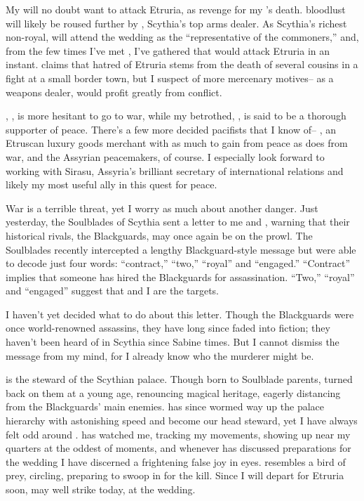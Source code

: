 \documentclass[char]{Kos}
\begin{document}
My \cScythiaQueen{\parent} will no doubt want to attack Etruria, as revenge for my \cFugitive{\sibling}'s death. \cScythiaQueen{\Their} bloodlust will likely be roused further by \cArmsDealer{}, Scythia's top arms dealer. As Scythia's richest non-royal, \cArmsDealer{} will attend the wedding as the ``representative of the commoners,'' and, from the few times I've met \cArmsDealer{\them}, I've gathered that \cArmsDealer{\they} would attack Etruria in an instant. \cArmsDealer{\They} claims that \cArmsDealer{\their} hatred of Etruria stems from the death of several cousins in a fight at a small border town, but I suspect \cArmsDealer{\them} of more mercenary motives-- as a weapons dealer, \cArmsDealer{} would profit greatly from conflict. 

\cScythiaKing{}, \cScythiaKing{\parent}, is more hesitant to go to war, while my betrothed, \cGroom{}, is said to be a thorough supporter of peace. There's a few more decided pacifists that I know of-- \cMerchant{}, an Etruscan luxury goods merchant with as much to gain from peace as \cArmsDealer{} does from war, and the Assyrian peacemakers, of course. I especially look forward to working with Sirasu, Assyria's brilliant secretary of international relations and likely my most useful ally in this quest for peace.

War is a terrible threat, yet I worry as much about another danger. Just yesterday, the Soulblades of Scythia sent a letter to me and \cGroom{}, warning that their historical rivals, the Blackguards, may once again be on the prowl. The Soulblades recently intercepted a lengthy Blackguard-style message but were able to decode just four words: ``contract,'' ``two,'' ``royal'' and ``engaged.'' ``Contract'' implies that someone has hired the Blackguards for assassination. ``Two,'' ``royal'' and ``engaged'' suggest that \cGroom{} and I are the targets.

I haven't yet decided what to do about this letter. Though the Blackguards were once world-renowned assassins, they have long since faded into fiction; they haven't been heard of in Scythia since Sabine times. But I cannot dismiss the message from my mind, for I already know who the murderer might be.

\cButler{} is the steward of the Scythian palace. Though born to Soulblade parents, \cButler{\they} turned \cButler{\their} back on them at a young age, renouncing \cButler{\their} magical heritage, eagerly distancing \cButler{\themself} from the Blackguards' main enemies. \cButler{\They} has since wormed \cButler{\their} way up the palace hierarchy with astonishing speed and become our head steward, yet I have always felt odd around \cButler{\them}. \cButler{} has watched me, tracking my movements, showing up near my quarters at the oddest of moments, and whenever \cButler{\they} has discussed preparations for the wedding I have discerned a frightening false joy in \cButler{\their} eyes. \cButler{\They} resembles a bird of prey, circling, preparing to swoop in for the kill. Since I will depart for Etruria soon, \cButler{\they} may well strike today, at the wedding.
\end{document}

